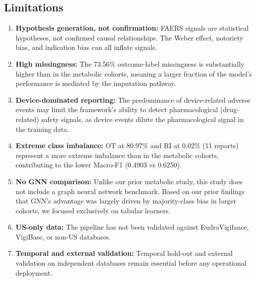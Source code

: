 \documentclass[10pt,twocolumn]{article}
\newcommand{\FAERS}{\textsf{FAERS}\xspace}
\begin{document}
\subsection{Limitations}
\begin{enumerate}[leftmargin=*,itemsep=3pt]
  \item \textbf{Hypothesis generation, not confirmation:} \FAERS signals are statistical hypotheses, not confirmed causal relationships. The Weber effect, notoriety bias, and indication bias can all inflate signals.
  \item \textbf{High missingness:} The 73.56\% outcome-label missingness is substantially higher than in the metabolic cohorts, meaning a larger fraction of the model's performance is mediated by the imputation pathway.
  \item \textbf{Device-dominated reporting:} The predominance of device-related adverse events may limit the framework's ability to detect pharmacological (drug-related) safety signals, as device events dilute the pharmacological signal in the training data.
  \item \textbf{Extreme class imbalance:} OT at 80.97\% and RI at 0.02\% (11 reports) represent a more extreme imbalance than in the metabolic cohorts, contributing to the lower Macro-F1 (0.4903 vs 0.6250).
  \item \textbf{No GNN comparison:} Unlike our prior metabolic study, this study does not include a graph neural network benchmark. Based on our prior findings that GNN's advantage was largely driven by majority-class bias in larger cohorts, we focused exclusively on tabular learners.
  \item \textbf{US-only data:} The pipeline has not been validated against EudraVigilance, VigiBase, or non-US databases.
  \item \textbf{Temporal and external validation:} Temporal hold-out and external validation on independent databases remain essential before any operational deployment.
\end{enumerate}
 
\end{document}
